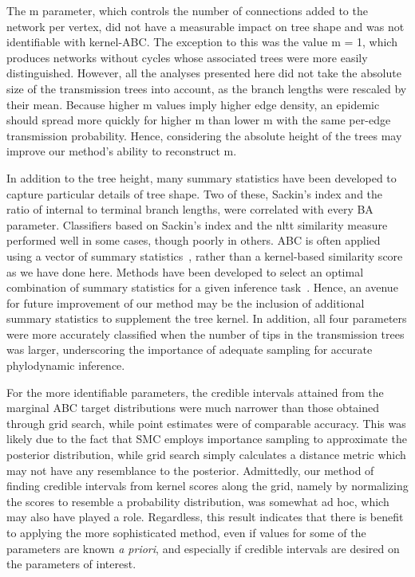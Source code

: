 The \gls{m} parameter, which controls the number of connections added to the
network per vertex, did not have a measurable impact on tree shape and was not
identifiable with kernel-ABC. The exception to this was the value \gls{m} = 1,
which produces networks without cycles whose associated trees were more easily
distinguished. However, all the analyses presented here did not take the
absolute size of the transmission trees into account, as the branch lengths
were rescaled by their mean. Because higher \gls{m} values imply higher edge
density, an epidemic should spread more quickly for higher \gls{m} than lower
\gls{m} with the same per-edge transmission probability.  Hence, considering
the absolute height of the trees may improve our method's ability to
reconstruct \gls{m}.

In addition to the tree height, many summary statistics have been developed to
capture particular details of tree shape. Two of these, Sackin's index and the
ratio of internal to terminal branch lengths, were correlated with every
\gls{BA} parameter. Classifiers based on Sackin's index and the \gls{nltt}
similarity measure performed well in some cases, though poorly in others.
\gls{ABC} is often applied using a vector of summary
statistics~\autocite{marin2012approximate, sunnaaker2013approximate}, rather
than a kernel-based similarity score as we have done here. Methods have been
developed to select an optimal combination of summary statistics for a given
inference task~\autocite{fearnhead2012constructing}. Hence, an avenue for
future improvement of our method may be the inclusion of additional summary
statistics to supplement the tree kernel. In addition, all four parameters were
more accurately classified when the number of tips in the transmission trees
was larger, underscoring the importance of adequate sampling for accurate
phylodynamic inference.

For the more identifiable parameters, the credible intervals attained from the
marginal \gls{ABC} target distributions were much narrower than those obtained
through grid search, while point estimates were of comparable accuracy. This
was likely due to the fact that \gls{SMC} employs importance sampling to
approximate the posterior distribution, while grid search simply calculates a
distance metric which may not have any resemblance to the posterior.
Admittedly, our method of finding credible intervals from kernel scores along
the grid, namely by normalizing the scores to resemble a probability
distribution, was somewhat ad hoc, which may also have played a role.
Regardless, this result indicates that there is benefit to applying the more
sophisticated method, even if values for some of the parameters are known
\textit{a priori}, and especially if credible intervals are desired on the
parameters of interest.

